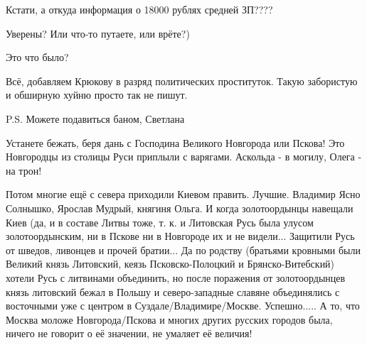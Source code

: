 \begin{itemize}
Кстати, а откуда информация о 18000 рублях средней ЗП????

Уверены? Или что-то путаете, или врёте?)

 
Это что было?

 

Всё, добавляем Крюкову в разряд политических проституток. Такую забористую и
обширную хуйню просто так не пишут.

P.S. Можете подавиться баном, Светлана

 

Устанете бежать, беря дань с Господина Великого Новгорода или Пскова! Это
Новгородцы из столицы Руси приплыли с варягами. Аскольда - в могилу, Олега - на
трон! 

Потом многие ещё с севера приходили Киевом править. Лучшие. Владимир Ясно
Солнышко, Ярослав Мудрый, княгиня Ольга. И когда золотоордынцы навещали Киев
(да, и в составе Литвы тоже, т. к. и Литовская Русь была улусом
золотоордынским, ни в Пскове ни в Новгороде их и не видели... Защитили Русь от
шведов, ливонцев и прочей братии... Да по родству (братьями кровными были
Великий князь Литовский, кеязь Псковско-Полоцкий и Брянско-Витебский) хотели
Русь с литвинами объединить, но после поражения от золотоордынцев князь
литовский бежал в Польшу и северо-западные славяне объединялись с восточными
уже с центром в Суздале/Владимире/Москве. Успешно..... А то, что Москва моложе
Новгорода/Пскова и многих других русских городов была, ничего не говорит о её
значении, не умаляет её величия!


 


\end{itemize}
